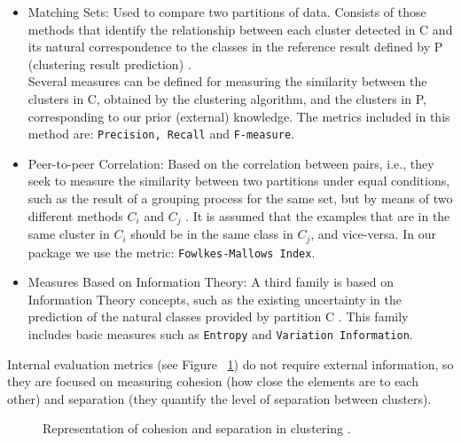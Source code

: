 \begin{itemize}
  \item Matching Sets: Used to compare two partitions of data. Consists of those methods that identify the relationship between each cluster detected in C and its natural correspondence to the classes in the reference result defined by P (clustering result prediction) \citep{b54}.\\
Several measures can be defined for measuring the similarity between the clusters in C, obtained by the clustering algorithm, and the clusters in P, corresponding to our prior (external) knowledge. The metrics included in this method are: \texttt{Precision, Recall} and \texttt{F-measure}.
  \item Peer-to-peer Correlation: Based on the correlation between pairs, i.e., they seek to measure the similarity between two partitions under equal conditions, such as the result of a grouping process for the same set, but by means of two different methods $ C_{i} $ and $ C_{j} $ \citep{b54}. It is assumed that the examples that are in the same cluster in $ C_{i} $ should be in the same class in $ C_{j} $, and vice-versa. In our package we use the metric: \texttt{Fowlkes-Mallows Index}.
  \item Measures Based on Information Theory: A third family is based on Information Theory concepts, such as the existing uncertainty in the prediction of the natural classes provided by partition C \citep{b54}. This family includes basic measures such as \texttt{Entropy} and \texttt{Variation Information}.
\end{itemize}
Internal evaluation metrics (see Figure ~\ref{fig:cohesion}) do not require external information, so they are focused on measuring cohesion (how close the elements are to each other) and separation (they quantify the level of separation between clusters).
\clearpage
\begin{figure}[htbp]
  \centering
    \caption{Representation of cohesion and separation in clustering \citep{b54}.}%
    \label{fig:cohesion}%
\end{figure}

